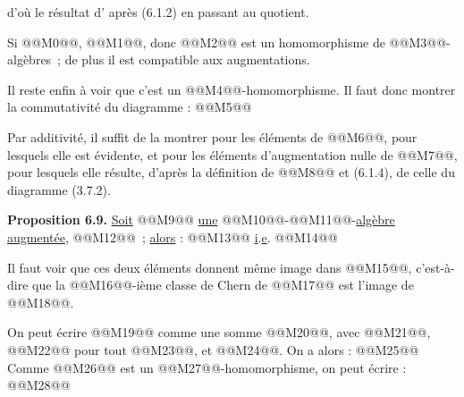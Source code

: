 
d'où le résultat d'%
après (6.1.2) en passant au quotient.

Si @@M0@@, @@M1@@, donc @@M2@@ est un homomorphisme de @@M3@@-algèbres~; de plus il est compatible aux augmentations.

Il reste enfin à voir que c'est un @@M4@@-homomorphisme. Il faut donc montrer la commutativité du diagramme :
@@M5@@

Par additivité, il suffit de la montrer pour les éléments de @@M6@@, pour lesquels elle est évidente, et pour les éléments d'augmentation nulle de @@M7@@, pour lesquels elle résulte, d'après la définition de @@M8@@ et (6.1.4), de celle du diagramme (3.7.2).

\textbf{Proposition 6.9.} \uline{Soit} @@M9@@ \uline{une} @@M10@@-@@M11@@-\uline{algèbre augmentée}, @@M12@@~; \uline{alors} :
@@M13@@
\uline{i}.\uline{e}.
@@M14@@

Il faut voir que ces deux éléments donnent même image dans @@M15@@, c'est-à-dire que la @@M16@@-ième classe de Chern de @@M17@@ est l'image de @@M18@@.

On peut écrire @@M19@@ comme une somme @@M20@@, avec @@M21@@, @@M22@@ pour tout @@M23@@, et @@M24@@. On a alors :
@@M25@@
Comme @@M26@@ est un @@M27@@-homomorphisme, on peut écrire :
@@M28@@
